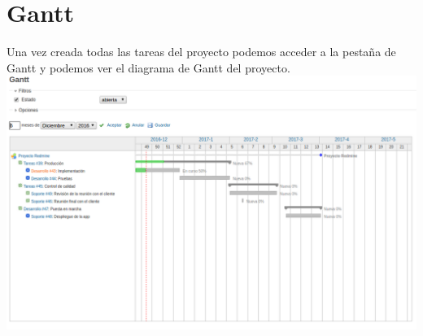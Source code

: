 \documentclass[a4paper,10pt]{scrartcl}
\begin{document}
\newpage
\section{Gantt}

Una vez creada todas las tareas del proyecto podemos acceder a la pestaña de Gantt y podemos ver el diagrama de Gantt del proyecto.\\

\includegraphics[width=\linewidth]{gantt}


\end{document}
